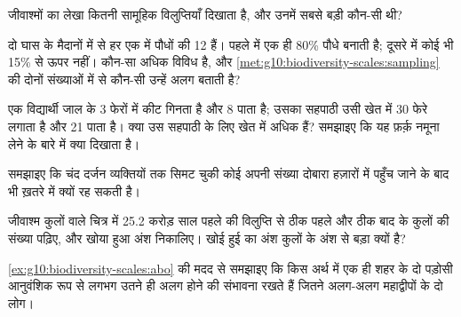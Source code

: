 \begin{exercise}[$\star$]\label{exo:g10:biodiversity-scales:5}
जीवाश्मों का लेखा कितनी सामूहिक विलुप्तियाँ दिखाता है, और उनमें सबसे बड़ी
कौन-सी थी?
\end{exercise}

\begin{exercise}[$\star\star$]\label{exo:g10:biodiversity-scales:6}
दो घास के मैदानों में से हर एक में पौधों की 12  हैं। पहले में
एक ही  80\% पौधे बनाती है; दूसरे में कोई भी  15\% से ऊपर
नहीं। कौन-सा अधिक विविध है, और
\cref{met:g10:biodiversity-scales:sampling} की दोनों संख्याओं में से
कौन-सी उन्हें अलग बताती है?
\end{exercise}

\begin{exercise}[$\star\star$]\label{exo:g10:biodiversity-scales:7}
एक विद्यार्थी जाल के 3 फेरों में कीट गिनता है और 8  पाता है;
उसका सहपाठी उसी खेत में 30 फेरे लगाता है और 21 पाता है। क्या उस सहपाठी के
लिए खेत में अधिक  हैं? समझाइए कि यह फ़र्क़ नमूना लेने के बारे
में क्या दिखाता है।
\end{exercise}

\begin{exercise}[$\star\star$]\label{exo:g10:biodiversity-scales:8}
समझाइए कि चंद दर्जन व्यक्तियों तक सिमट चुकी कोई  अपनी संख्या
दोबारा हज़ारों में पहुँच जाने के बाद भी ख़तरे में क्यों रह सकती है।
\end{exercise}

\begin{exercise}[$\star\star$]\label{exo:g10:biodiversity-scales:9}
जीवाश्म कुलों वाले चित्र में 25.2 करोड़ साल पहले की विलुप्ति से ठीक पहले
और ठीक बाद के कुलों की संख्या पढ़िए, और खोया हुआ अंश निकालिए। खोई हुई
\emph{} का अंश कुलों के अंश से बड़ा क्यों है?
\end{exercise}

\begin{exercise}[$\star\star$]\label{exo:g10:biodiversity-scales:10}
\cref{ex:g10:biodiversity-scales:abo} की मदद से समझाइए कि किस अर्थ में एक
ही शहर के दो पड़ोसी आनुवंशिक रूप से लगभग उतने ही अलग होने की संभावना रखते
हैं जितने अलग-अलग महाद्वीपों के दो लोग।
\end{exercise}

